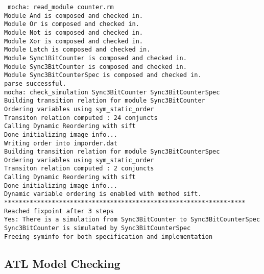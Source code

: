 \mypar
{\tt
mocha: read\_module counter.rm \\
Module And is composed and checked in. \\
Module Or is composed and checked in. \\
Module Not is composed and checked in. \\
Module Xor is composed and checked in. \\
Module Latch is composed and checked in. \\
Module Sync1BitCounter is composed and checked in. \\
Module Sync3BitCounter is composed and checked in. \\
Module Sync3BitCounterSpec is composed and checked in. \\
parse successful. \\
mocha: check\_simulation Sync3BitCounter Sync3BitCounterSpec \\
Building transition relation for module Sync3BitCounter \\
Ordering variables using sym\_static\_order \\
Transiton relation computed : 24 conjuncts \\
Calling Dynamic Reordering with sift \\
Done initializing image info... \\
Writing order into imporder.dat \\
Building transition relation for module Sync3BitCounterSpec \\
Ordering variables using sym\_static\_order \\
Transiton relation computed : 2 conjuncts \\
Calling Dynamic Reordering with sift \\
Done initializing image info... \\
Dynamic variable ordering is enabled with method sift. \\
 
 ****************************************************************** \\
 Reached fixpoint after  3 steps \\
Yes: There is a simulation from Sync3BitCounter to Sync3BitCounterSpec \\
Sync3BitCounter is simulated by Sync3BitCounterSpec \\
Freeing syminfo for both specification and implementation \\
}

\subsection{ATL Model Checking}

